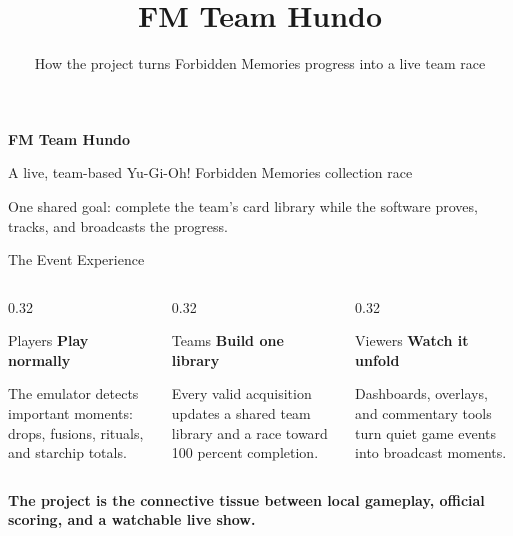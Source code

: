 \documentclass[aspectratio=169,11pt]{beamer}
\title[FM Team Hundo]{FM Team Hundo}
\subtitle{How the project turns Forbidden Memories progress into a live team race}
\author{}
\date{}
\newcommand{\statcard}[3]{%
  \begin{block}{#1}
    {\large\textbf{#2}}\par
    \vspace{0.25em}
    #3
  \end{block}
}
\begin{document}
\begin{frame}[plain]
  \vspace{1.25cm}
  {\color{white}\Huge\bfseries FM Team Hundo\par}
  \vspace{0.35cm}
  {\color{white}\Large A live, team-based Yu-Gi-Oh! Forbidden Memories collection race\par}
  \vspace{1.0cm}
  {\color{white}\large One shared goal: complete the team's card library while the software proves, tracks, and broadcasts the progress.}
\end{frame}

\begin{frame}{The Event Experience}
  \begin{columns}[T,onlytextwidth]
    \begin{column}{0.32\textwidth}
      \statcard{Players}{Play normally}{The emulator detects important moments: drops, fusions, rituals, and starchip totals.}
    \end{column}
    \begin{column}{0.32\textwidth}
      \statcard{Teams}{Build one library}{Every valid acquisition updates a shared team library and a race toward 100 percent completion.}
    \end{column}
    \begin{column}{0.32\textwidth}
      \statcard{Viewers}{Watch it unfold}{Dashboards, overlays, and commentary tools turn quiet game events into broadcast moments.}
    \end{column}
  \end{columns}

  \vspace{0.45cm}
  \begin{center}
    \Large\textbf{The project is the connective tissue between local gameplay, official scoring, and a watchable live show.}
  \end{center}
\end{frame}
\end{document}
